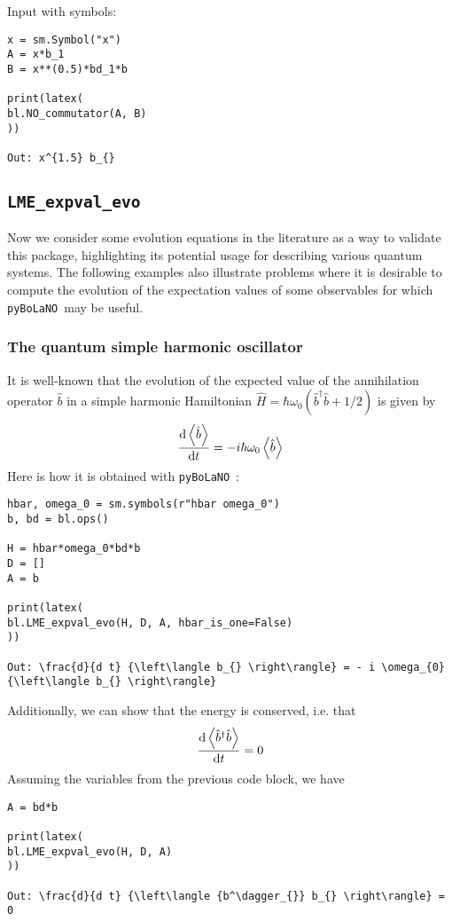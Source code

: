\documentclass[5p, twocolumn, 10pt, sort&compress]{elsarticle}
\newcommand{\inlinecode}[1]{\texttt{#1}}
\newcommand{\expval}[1]{\left\langle{#1}\right\rangle}
\newcommand{\bop}{\hat{b}}
\newcommand{\bdag}{\bop^\dagger}
\newcommand{\pybolano}{\texttt{pyBoLaNO}~}
\begin{document}
\noindent Input with symbols:
\begin{verbatim}
x = sm.Symbol("x")
A = x*b_1 
B = x**(0.5)*bd_1*b

print(latex(
bl.NO_commutator(A, B)
))

Out: x^{1.5} b_{}
\end{verbatim}


\subsection{\inlinecode{LME_expval_evo}}

Now we consider some evolution equations in the literature as a way to validate this package, highlighting its potential usage for describing various quantum systems.  The following examples also illustrate problems where it is desirable to compute the evolution of the expectation values of some observables for which \pybolano may be useful. 

\subsubsection{The quantum simple harmonic oscillator}

It is well-known that the evolution of the expected value of the annihilation operator $\bop$ in a simple harmonic Hamiltonian $\hat{H} = \hbar\omega_0\left(\bdag\bop+1/2\right)$ is given by
\begin{equation}
    \odv{\expval{\bop}}{t} = -i\hbar\omega_0\expval{\bop}
\end{equation}
Here is how it is obtained with \pybolano:
\begin{verbatim}
hbar, omega_0 = sm.symbols(r"hbar omega_0")
b, bd = bl.ops()

H = hbar*omega_0*bd*b
D = []
A = b

print(latex(
bl.LME_expval_evo(H, D, A, hbar_is_one=False)
))

Out: \frac{d}{d t} {\left\langle b_{} \right\rangle} = - i \omega_{0} {\left\langle b_{} \right\rangle}
\end{verbatim}
Additionally, we can show that the energy is conserved, i.e. that
\begin{equation}
    \odv{\expval{\bdag\bop}}{t} = 0
\end{equation}
Assuming the variables from the previous code block, we have
\begin{verbatim}
A = bd*b

print(latex(
bl.LME_expval_evo(H, D, A)
))

Out: \frac{d}{d t} {\left\langle {b^\dagger_{}} b_{} \right\rangle} = 0
\end{verbatim}
\end{document}
